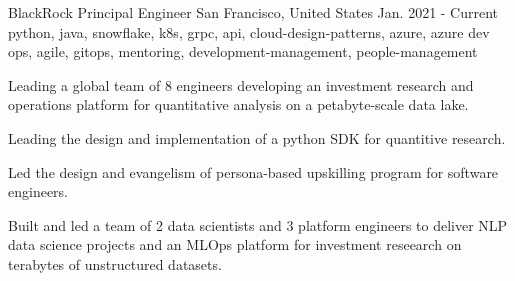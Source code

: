\cventry
    {BlackRock} %
    {Principal Engineer} %
    {San Francisco, United States} %
    {Jan. 2021 - Current} %
    { python, java, snowflake, k8s, grpc, api, cloud-design-patterns, azure, azure dev ops, agile, gitops, mentoring, development-management, people-management} %
    {
    \begin{cvitems} %
       \item { Leading a global team of 8 engineers developing an investment research and operations platform for quantitative analysis on a petabyte-scale data lake. }
       \item { Leading the design and implementation of a python SDK for quantitive research. }
       \item { Led the design and evangelism of persona-based upskilling program for software engineers. }
       \item { Built and led a team of 2 data scientists and 3 platform engineers to deliver NLP data science projects and an MLOps platform for investment reseearch on terabytes of unstructured datasets. }
    \end{cvitems}
    }
